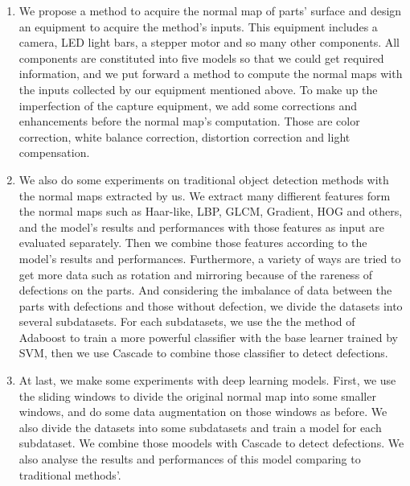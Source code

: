 \begin{englishabstract}
\begin{enumerate}
\item We propose a method to acquire the normal map of parts' surface and  design an equipment to acquire the method's inputs. 
This equipment includes a camera, LED light bars, a stepper motor and so many other components. 
All components are constituted into five models so that we could get required information,
and we put forward a method to compute the normal maps with the inputs collected by our equipment mentioned above.
To make up the imperfection of the capture equipment,
we add some corrections and enhancements before the normal map's computation.
Those are
color correction,
white balance correction,
distortion correction 
and light compensation.
\item 
We also do some experiments on traditional object detection methods with the normal maps extracted by us.
We extract many diffierent features form the normal maps such as Haar-like, LBP, GLCM, Gradient, HOG and others,
and the model's results and performances with those features as input are evaluated separately.
Then we combine those features according to the model's results and performances. 
Furthermore, a variety of ways are tried to get more data such as rotation and mirroring because of the rareness of defections on the parts.
And considering the imbalance of data between the parts with defections and those without defection, 
we divide the datasets into several subdatasets.
For each subdatasets,
we use the the method of Adaboost to train a more powerful classifier with the base learner trained by SVM, then we use Cascade to combine those classifier to detect defections.
\item At last, we make some experiments with deep learning models. 
First, we use the sliding windows to divide the original normal map into some smaller windows,
and do some data augmentation on those windows as before. 
We also divide the datasets into some subdatasets and train a model for each subdataset.
We combine those moodels with Cascade to detect defections.
We also analyse the results and performances of this model comparing to traditional methods'.
\end{enumerate}






\end{englishabstract}
